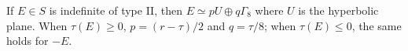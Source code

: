 If $E \in S$ is indefinite of type II, then $E \simeq pU \oplus q\Gamma_8$ where $U$ is the hyperbolic plane. When $\tau(E) \geq 0$, $p = (r-\tau)/2$ and $q = \tau/8$; when $\tau(E) \leq 0$, the same holds for $-E$.
